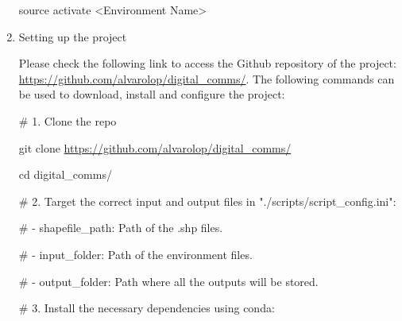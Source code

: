 \begin{enumerate}
{\fontsize{9pt}{10.8pt}\selectfont source activate <Environment Name>\par}\par

	\item Setting up the project\par

Please check the following link to access the Github repository of the project: \href{https://github.com/alvarolop/digital\_comms/}{https://github.com/alvarolop/digital\_comms/}. The following commands can be used to download, install and configure the project:\par

{\fontsize{9pt}{10.8pt}\selectfont $\#$  1. Clone the repo\par}\par

{\fontsize{9pt}{10.8pt}\selectfont git clone \href{https://github.com/alvarolop/digital\_comms/}{https://github.com/alvarolop/digital\_comms/}\par}\par

{\fontsize{9pt}{10.8pt}\selectfont cd digital\_comms/\par}\par


\vspace{\baselineskip}
{\fontsize{9pt}{10.8pt}\selectfont $\#$  2. Target the correct input and output files in "./scripts/script\_config.ini":\par}\par


\vspace{\baselineskip}
{\fontsize{9pt}{10.8pt}\selectfont $\#$  - shapefile\_path: Path of the .shp files.\par}\par

{\fontsize{9pt}{10.8pt}\selectfont $\#$  - input\_folder: Path of the environment files.\par}\par

{\fontsize{9pt}{10.8pt}\selectfont $\#$  - output\_folder: Path where all the outputs will be stored. \par}\par


\vspace{\baselineskip}
{\fontsize{9pt}{10.8pt}\selectfont $\#$  3. Install the necessary dependencies using conda:\par}\par



\end{enumerate}

